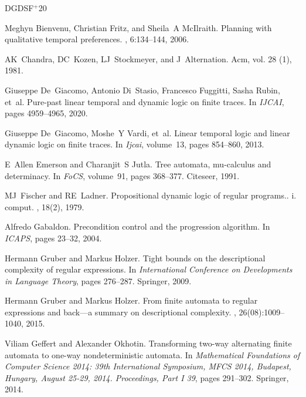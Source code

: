 \documentclass[10pt,a4paper]{amsart}
\theoremstyle{plain}
\theoremstyle{definition}
\theoremstyle{definition}
\DeclareMathOperator{\?}{?}
\begin{document}
\newcommand{\etalchar}[1]{$^{#1}$}
\begin{thebibliography}{DGDSF{\etalchar{+}}20}

Meghyn Bienvenu, Christian Fritz, and Sheila~A McIlraith.
\newblock Planning with qualitative temporal preferences.
, 6:134--144, 2006.

AK~Chandra, DC~Kozen, LJ~Stockmeyer, and J~Alternation.
\newblock Acm, vol. 28 (1), 1981.

\bibitem[DGDSF{\etalchar{+}}20]{pldlf}
Giuseppe De~Giacomo, Antonio Di~Stasio, Francesco Fuggitti, Sasha Rubin, et~al.
\newblock Pure-past linear temporal and dynamic logic on finite traces.
\newblock In {\em IJCAI}, pages 4959--4965, 2020.

\bibitem[DGV{\etalchar{+}}13]{ldlf}
Giuseppe De~Giacomo, Moshe~Y Vardi, et~al.
\newblock Linear temporal logic and linear dynamic logic on finite traces.
\newblock In {\em Ijcai}, volume~13, pages 854--860, 2013.

E~Allen Emerson and Charanjit~S Jutla.
\newblock Tree automata, mu-calculus and determinacy.
\newblock In {\em FoCS}, volume~91, pages 368--377. Citeseer, 1991.

MJ~Fischer and RE~Ladner.
\newblock Propositional dynamic logic of regular programs.. i. comput.
, 18(2), 1979.

Alfredo Gabaldon.
\newblock Precondition control and the progression algorithm.
\newblock In {\em ICAPS}, pages 23--32, 2004.

Hermann Gruber and Markus Holzer.
\newblock Tight bounds on the descriptional complexity of regular expressions.
\newblock In {\em International Conference on Developments in Language Theory}, pages 276--287. Springer, 2009.

Hermann Gruber and Markus Holzer.
\newblock From finite automata to regular expressions and back—a summary on descriptional complexity.
, 26(08):1009--1040, 2015.

Viliam Geffert and Alexander Okhotin.
\newblock Transforming two-way alternating finite automata to one-way nondeterministic automata.
\newblock In {\em Mathematical Foundations of Computer Science 2014: 39th International Symposium, MFCS 2014, Budapest, Hungary, August 25-29, 2014. Proceedings, Part I 39}, pages 291--302. Springer, 2014.


\end{thebibliography}
\end{document}

